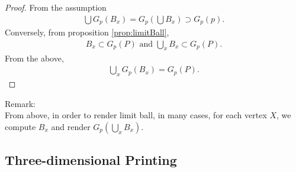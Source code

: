 \documentclass[suppldata, dvipdfmx]{interact}
\theoremstyle{plain}%
\theoremstyle{definition}
\theoremstyle{remark}
\theoremstyle{problemstyle}
\begin{document}
\begin{proof}
 From the assumption 
 \begin{align*}
  \bigcup G_p(B_x) = G_p (\bigcup B_x) \supset G_p(p).
 \end{align*}
 Conversely, from proposition \ref{prop:limitBall},
 \begin{align*}
  B_x \subset G_p(P) \text{ and } \displaystyle\bigcup_{x} B_x \subset G_p(P)\text{.}
 \end{align*}
 From the above,
\begin{align*}
 \displaystyle\bigcup_x G_p(B_x) = G_p(P).
\end{align*}
\end{proof}
\noindent Remark: \\
From above, in order to render limit ball,
in many cases, for each vertex $X$, we compute $B_x$ and render
$G_p(\displaystyle\bigcup_x B_x)$.


\subsection{Three-dimensional Printing}
\end{document}
